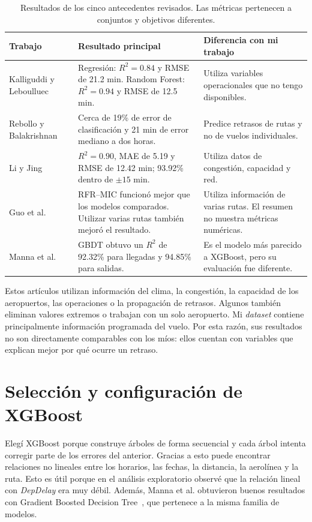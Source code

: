 \documentclass[a4paper,12pt,twocolumn]{report}
\begin{document}
\begin{table}[t]
	\centering
	\footnotesize
	\begin{tabular}{p{3.2cm}p{6.0cm}p{5.2cm}}
		\hline
		Trabajo & Resultado principal & Diferencia con mi trabajo \\
		\hline
		Kalliguddi y Leboulluec~\cite{kalliguddi2017} & Regresión: $R^2=0.84$ y RMSE de 21.2 min. Random Forest: $R^2=0.94$ y RMSE de 12.5 min. & Utiliza variables operacionales que no tengo disponibles. \\
		Rebollo y Balakrishnan~\cite{rebollo2014} & Cerca de 19\% de error de clasificación y 21 min de error mediano a dos horas. & Predice retrasos de rutas y no de vuelos individuales. \\
		Li y Jing~\cite{li2021} & $R^2=0.90$, MAE de 5.19 y RMSE de 12.42 min; 93.92\% dentro de $\pm15$ min. & Utiliza datos de congestión, capacidad y red. \\
		Guo et al.~\cite{guo2021} & RFR--MIC funcionó mejor que los modelos comparados. Utilizar varias rutas también mejoró el resultado. & Utiliza información de varias rutas. El resumen no muestra métricas numéricas. \\
		Manna et al.~\cite{manna2017} & GBDT obtuvo un $R^2$ de 92.32\% para llegadas y 94.85\% para salidas. & Es el modelo más parecido a XGBoost, pero su evaluación fue diferente. \\
		\hline
	\end{tabular}
	\caption{Resultados de los cinco antecedentes revisados. Las métricas pertenecen a conjuntos y objetivos diferentes.}
	\label{tab:literature-results}
\end{table}

Estos artículos utilizan información del clima, la congestión, la capacidad de los aeropuertos, las operaciones o la propagación de retrasos. Algunos también eliminan valores extremos o trabajan con un solo aeropuerto. Mi \textit{dataset} contiene principalmente información programada del vuelo. Por esta razón, sus resultados no son directamente comparables con los míos: ellos cuentan con variables que explican mejor por qué ocurre un retraso.

\section{Selección y configuración de XGBoost}

Elegí XGBoost porque construye árboles de forma secuencial y cada árbol intenta corregir parte de los errores del anterior. Gracias a esto puede encontrar relaciones no lineales entre los horarios, las fechas, la distancia, la aerolínea y la ruta. Esto es útil porque en el análisis exploratorio observé que la relación lineal con \textit{DepDelay} era muy débil. Además, Manna et al. obtuvieron buenos resultados con Gradient Boosted Decision Tree~\cite{manna2017}, que pertenece a la misma familia de modelos.
\end{document}
